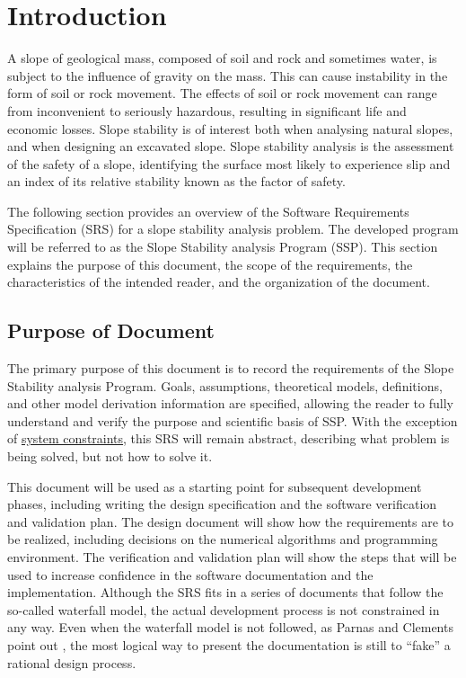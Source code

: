 \documentclass[12pt]{article}
\begin{document}
\section{Introduction}
\label{Sec:Intro}
A slope of geological mass, composed of soil and rock and sometimes water, is subject to the influence of gravity on the mass. This can cause instability in the form of soil or rock movement. The effects of soil or rock movement can range from inconvenient to seriously hazardous, resulting in significant life and economic losses. Slope stability is of interest both when analysing natural slopes, and when designing an excavated slope. Slope stability analysis is the assessment of the safety of a slope, identifying the surface most likely to experience slip and an index of its relative stability known as the factor of safety.

The following section provides an overview of the Software Requirements Specification (SRS) for a slope stability analysis problem. The developed program will be referred to as the Slope Stability analysis Program (SSP). This section explains the purpose of this document, the scope of the requirements, the characteristics of the intended reader, and the organization of the document.

\subsection{Purpose of Document}
\label{Sec:DocPurpose}
The primary purpose of this document is to record the requirements of the Slope Stability analysis Program. Goals, assumptions, theoretical models, definitions, and other model derivation information are specified, allowing the reader to fully understand and verify the purpose and scientific basis of SSP. With the exception of \hyperref[Sec:SysConstraints]{system constraints}, this SRS will remain abstract, describing what problem is being solved, but not how to solve it.

This document will be used as a starting point for subsequent development phases, including writing the design specification and the software verification and validation plan. The design document will show how the requirements are to be realized, including decisions on the numerical algorithms and programming environment. The verification and validation plan will show the steps that will be used to increase confidence in the software documentation and the implementation. Although the SRS fits in a series of documents that follow the so-called waterfall model, the actual development process is not constrained in any way. Even when the waterfall model is not followed, as Parnas and Clements point out \cite{parnasClements1986}, the most logical way to present the documentation is still to ``fake'' a rational design process.
\end{document}

